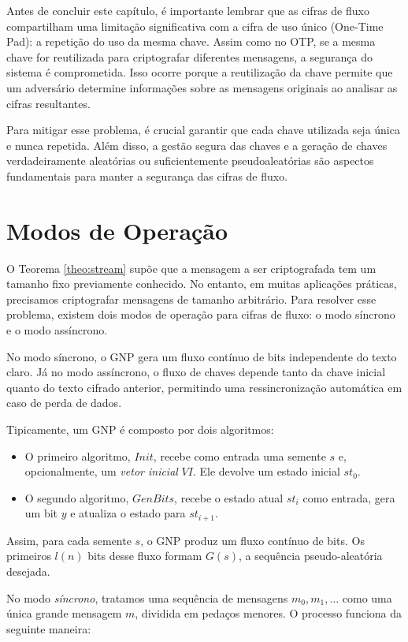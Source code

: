 Antes de concluir este capítulo, é importante lembrar que as cifras de fluxo compartilham uma limitação significativa com a cifra de uso único (One-Time Pad):
a repetição do uso da mesma chave.
Assim como no OTP, se a mesma chave for reutilizada para criptografar diferentes mensagens, a segurança do sistema é comprometida.
Isso ocorre porque a reutilização da chave permite que um adversário determine informações sobre as mensagens originais ao analisar as cifras resultantes.

Para mitigar esse problema, é crucial garantir que cada chave utilizada seja única e nunca repetida.
Além disso, a gestão segura das chaves e a geração de chaves verdadeiramente aleatórias ou suficientemente pseudoaleatórias são aspectos fundamentais para manter a segurança das cifras de fluxo.

\section{Modos de Operação}
\label{sec:modos-de-operacao}

O Teorema \ref{theo:stream} supõe que a mensagem a ser criptografada tem um tamanho fixo previamente conhecido.
No entanto, em muitas aplicações práticas, precisamos criptografar mensagens de tamanho arbitrário.
Para resolver esse problema, existem dois modos de operação para cifras de fluxo: o modo síncrono e o modo assíncrono.

No modo síncrono, o GNP gera um fluxo contínuo de bits independente do texto claro.
Já no modo assíncrono, o fluxo de chaves depende tanto da chave inicial quanto do texto cifrado anterior, permitindo uma ressincronização automática em caso de perda de dados.

Tipicamente, um GNP é composto por dois algoritmos: 
\begin{itemize}
\item O primeiro algoritmo, $Init$, recebe como entrada uma semente $s$ e, opcionalmente, um {\em vetor inicial} $VI$.
  Ele devolve um estado inicial $st_0$.
\item  O segundo algoritmo, $GenBits$, recebe o estado atual $st_i$ como entrada, gera um bit $y$ e atualiza o estado para $st_{i+1}$.
\end{itemize}

Assim, para cada semente $s$, o GNP produz um fluxo contínuo de bits.
Os primeiros $l(n)$ bits desse fluxo formam $G(s)$, a sequência pseudo-aleatória desejada.

No modo \textit{síncrono}, tratamos uma sequência de mensagens $m_0, m_1, \dots$ como uma única grande mensagem $m$, dividida em pedaços menores.
O processo funciona da seguinte maneira:

